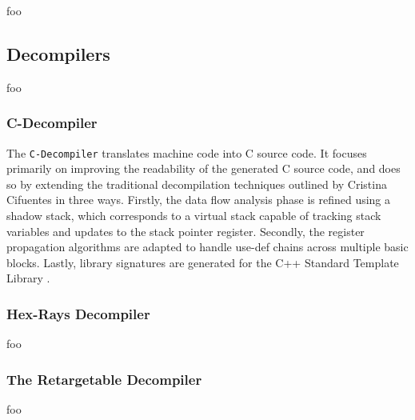 
\cite{mcsema}

foo


\subsection{Decompilers}

foo


\subsubsection{C-Decompiler}

The \texttt{C-Decompiler} translates machine code into C source code. It focuses primarily on improving the readability of the generated C source code, and does so by extending the traditional decompilation techniques outlined by Cristina Cifuentes in three ways. Firstly, the data flow analysis phase is refined using a shadow stack, which corresponds to a virtual stack capable of tracking stack variables and updates to the stack pointer register. Secondly, the register propagation algorithms are adapted to handle use-def chains across multiple basic blocks. Lastly, library signatures are generated for the C++ Standard Template Library \cite{readable_c_decomp}.


\subsubsection{Hex-Rays Decompiler}

foo

\cite{hexrays}


\subsubsection{The Retargetable Decompiler}
\label{sec:retargetable_decompiler}


foo

\cite{retargetable_decomp}
